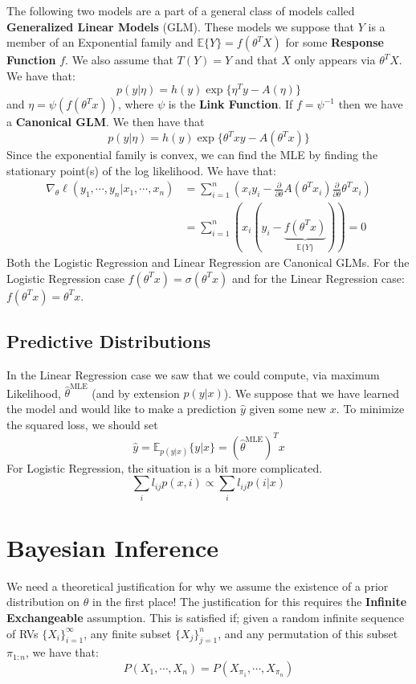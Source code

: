 \documentclass[]{article}
\theoremstyle{mattstyle}
\theoremstyle{definition}
\begin{document}
The following two models are a part of a general class of models called \textbf{Generalized Linear Models} (GLM). These models we suppose that $Y$ is a member of an Exponential family and $\mathbb{E}\{Y\}=f(\theta^TX)$ for some \textbf{Response Function} $f$. We also assume that $T(Y)=Y$ and that $X$ only appears via $\theta^TX$. We have that:
$$p(y|\eta)=h(y)\exp\{\eta^Ty-A(\eta)\}$$
and $\eta = \psi(f(\theta^Tx))$, where $\psi$ is the \textbf{Link Function}. If $f=\psi^{-1}$ then we have a \textbf{Canonical GLM}. We then have that
$$p(y|\eta)=h(y)\exp\{\theta^Txy-A(\theta^Tx)\}$$
Since the exponential family is convex, we can find the MLE by finding the stationary point(s) of the log likelihood. We have that:
\begin{align*}
\nabla_{\theta} \ell(y_1, \cdots, y_n | x_1, \cdots, x_n) &= \sum_{i=1}^n\left( x_iy_i - \frac{\partial}{\partial \theta}A(\theta^Tx_i)\frac{\partial}{\partial \theta}\theta^Tx_i \right)\\
&= \sum_{i=1}^n( x_i(y_i - \underbrace{f(\theta^Tx)}_{\mathbb{E}\{Y\}}))=0
\end{align*}
Both the Logistic Regression and Linear Regression are Canonical GLMs. For the Logistic Regression case $f(\theta^Tx)=\sigma(\theta^Tx)$ and for the Linear Regression case: $f(\theta^Tx)=\theta^Tx$.

\subsection{Predictive Distributions}

In the Linear Regression case we saw that we could compute, via maximum Likelihood, $\hat{\theta}^{\text{MLE}}$ (and by extension $p(y|x)$). We suppose that we have learned the model and would like to make a prediction $\hat{y}$ given some new $x$. To minimize the squared loss, we should set $$\hat{y}=\mathbb{E}_{p(y|x)}\{y|x\}=(\hat{\theta}^{\text{MLE}})^Tx$$
For Logistic Regression, the situation is a bit more complicated.
$$\sum_i l_{ij} p(x, i)\propto \sum_i l_{ij} p(i|x)$$
\newpage

\section{Bayesian Inference}
We need a theoretical justification for why we assume the existence of a prior distribution on \(\theta\) in the first place! The justification for this requires the \textbf{Infinite Exchangeable} assumption. This is satisfied if; given a random infinite sequence of RVs \( \{X_i\}_{i=1}^{\infty}\), any finite subset \(\{X_j\}_{j=1}^{n}\), and any permutation of this subset \(\pi_{1:n}\), we have that:
\begin{equation}
P(X_1, \cdots, X_n) = P(X_{\pi_1}, \cdots, X_{\pi_n})
\end{equation}
\end{document}
